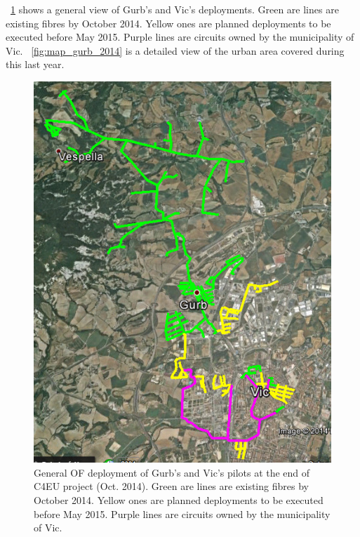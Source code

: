 \figurename~\ref{fig:map_gurbVic_2014} shows a general view of Gurb's and Vic's deployments. Green are lines are existing fibres by October 2014. Yellow ones are planned deployments to be executed before May 2015. Purple lines are circuits owned by the municipality of Vic. \figurename~\ref{fig:map_gurb_2014} is a detailed view of the urban area covered during this last year.

\begin{figure}[H]
  \centering
  \includegraphics[width=0.95\linewidth]{sect2/figures/map_gurbVic_2014.jpg}
  \caption[Gurb's and Vic's pilot - general OF deployment map at the end of C4EU project (Oct. 2014)]{General OF deployment of Gurb's and Vic's pilots at the end of C4EU project (Oct. 2014). Green are lines are existing fibres by October 2014. Yellow ones are planned deployments to be executed before May 2015. Purple lines are circuits owned by the municipality of Vic.}
  \label{fig:map_gurbVic_2014}
\end{figure}


